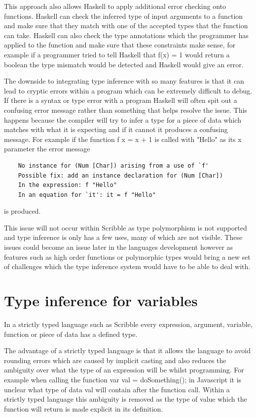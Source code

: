 \documentclass[]{final_report}
\begin{document}
This approach also allows Haskell to apply additional error checking onto functions. Haskell can check the inferred type of input arguments to a function and make sure that they match with one of the accepted types that the function can take. Haskell can also check the type annotations which the programmer has applied to the function and make sure that these constraints make sense, for example if a programmer tried to tell Haskell that f(x) = 1 would return a boolean the type mismatch would be detected and Haskell would give an error.

The downside to integrating type inference with so many features is that it can lead to cryptic errors within a program which can be extremely difficult to debug. If there is a syntax or type error with a program Haskell will often spit out a confusing error message rather than something that helps resolve the issue. This happens because the compiler will try to infer a type for a piece of data which matches with what it is expecting and if it cannot it produces a confusing message. For example if the function f x = x + 1 is called with "Hello" as its x parameter the error message
\begin{verbatim}
    No instance for (Num [Char]) arising from a use of `f'
    Possible fix: add an instance declaration for (Num [Char])
    In the expression: f "Hello"
    In an equation for `it': it = f "Hello"
\end{verbatim}
is produced. 

This issue will not occur within Scribble as type polymorphism is not supported and type inference is only has a few uses, many of which are not visible. These issues could become an issue later in the languages development however as features such as high order functions or polymorphic types would bring a new set of challenges which the type inference system would have to be able to deal with.

\section{Type inference for variables}

In a strictly typed language such as Scribble every expression, argument, variable, function or piece of data has a defined type.

The advantage of a strictly typed language is that it allows the language to avoid rounding errors which are caused by implicit casting and also reduces the ambiguity over what the type of an expression will be whilst programming. For example when calling the function var val = doSomething(); in Javascript it is unclear what type of data val will contain after the function call. Within a strictly typed language this ambiguity is removed as the type of value which the function will return is made explicit in its definition.
\end{document}
